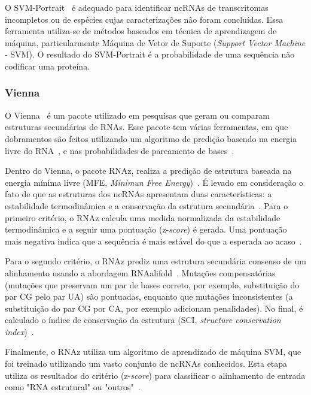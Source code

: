 O SVM-Portrait~\citep{Arrial:2006,arrial2009screening:2009} é adequado para identificar ncRNAs de transcritomas incompletos ou de espécies cujas caracterizações não foram concluídas. Essa ferramenta utiliza-se de métodos baseados em técnica de aprendizagem de máquina, particularmente Máquina de Vetor de Suporte (\textit{Support Vector Machine} - SVM). O resultado do SVM-Portrait é a probabilidade de uma sequência não codificar uma proteína.



\subsubsection*{Vienna}

O Vienna~\citep{hofacker1994fast:1994} é um pacote utilizado em pesquisas que geram ou comparam estruturas secundárias de RNAs. Esse pacote tem várias ferramentas, em que dobramentos são feitos utilizando um algoritmo de predição basendo na energia livre do RNA~\citep{zuker1984rna:1984}, e nas probabilidades de pareamento de bases~\citep{mccaskill1990equilibrium:1990}. 

Dentro do Vienna, o pacote RNAz, realiza a predição de estrutura baseada na energia mínima livre (MFE, \textit{Minimun Free Energy})~\citep{zuker1981optimal:1981,hofacker1994fast:1994}. É levado em consideração o fato de que as estruturas dos ncRNAs apresentam duas características: a estabilidade termodinâmica e a conservação da estrutura secundária~\citep{gruber2007rnaz:2007}. Para o primeiro critério, o RNAz calcula uma medida normalizada da estabilidade termodinâmica e a seguir uma pontuação (z-\textit{score}) é gerada. Uma pontuação mais negativa indica que a sequência é mais estável do que a esperada ao acaso~\citep{gruber2007rnaz:2007}.

Para o segundo critério, o RNAz prediz uma estrutura secundária consenso de um alinhamento usando a abordagem RNAalifold~\citep{hofacker2002secondary:2002}. Mutações compensatórias (mutações que preservam um par de bases correto, por exemplo, substituição do par CG pelo par UA) são pontuadas, enquanto que mutações inconsistentes (a substituição do par CG por CA, por exemplo adicionam penalidades). No final, é calculado o índice de conservação da estrutura (SCI, \textit{structure conservation index})~\citep{gruber2007rnaz:2007}.

Finalmente, o RNAz utiliza um algoritmo de aprendizado de máquina SVM, que foi treinado utilizando um vasto conjunto de ncRNAs conhecidos. Esta etapa utiliza os resultados do critério (z-\textit{score}) para classificar o alinhamento de entrada como "RNA estrutural" ou "outros"~\citep{gruber2007rnaz:2007}.



